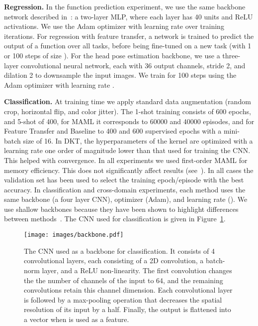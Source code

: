 \documentclass{article}
\begin{document}
\textbf{Regression.} In the function prediction experiment, we use the same backbone network described in~\citet{finn2017model}: a two-layer MLP, where each layer has 40 units and ReLU activations. We use the Adam optimizer with learning rate  over  training iterations. For regression with feature transfer, a network is trained to predict the output of a function over all tasks, before being fine-tuned on a new task (with 1 or 100 steps of size ).
For the head pose estimation backbone, we use a three-layer convolutional neural network, each with 36 output channels, stride 2, and dilation 2 to downsample the  input images. We train for 100 steps using the Adam optimizer with learning rate . 
 
\textbf{Classification.} At training time we apply standard data augmentation (random crop, horizontal flip, and color jitter). The 1-shot training consists of 600 epochs, and 5-shot of 400, for MAML it corresponds to 60000 and 40000 episodes, and for Feature Transfer and Baseline to 400 and 600 supervised epochs with a mini-batch size of 16. In DKT, the hyperparameters of the kernel are optimized with a learning rate one order of magnitude lower than that used for training the CNN. This helped with convergence. In all experiments we used first-order MAML for memory efficiency. This does not significantly affect results (see~\citealp{chen2019closerfewshot}). In all cases  the validation set has been used to select the training epoch/episode with the best accuracy. In classification and cross-domain experiments, each method uses the same backbone (a four layer CNN), optimizer (Adam), and learning rate (). We use shallow backbones because they have been shown to highlight differences between methods~\citep{chen2019closerfewshot}. The CNN used for classification is given in Figure~\ref{fig_backbone}.

\begin{figure}[H]
\centerline{
\texttt{[image: images/backbone.pdf]}}
\caption{The CNN used as a backbone for classification. It consists of 4 convolutional layers, each consisting of a 2D convolution, a batch-norm layer, and a ReLU non-linearity. The first convolution changes the the number of channels of the input to 64, and the remaining convolutions retain this channel dimension. Each convolutional layer is followed by a max-pooling operation that decreases the spatial resolution of its input by a half. Finally, the output is flattened into a vector when is used as a feature.}
\label{fig_backbone}
\end{figure}
\end{document}
